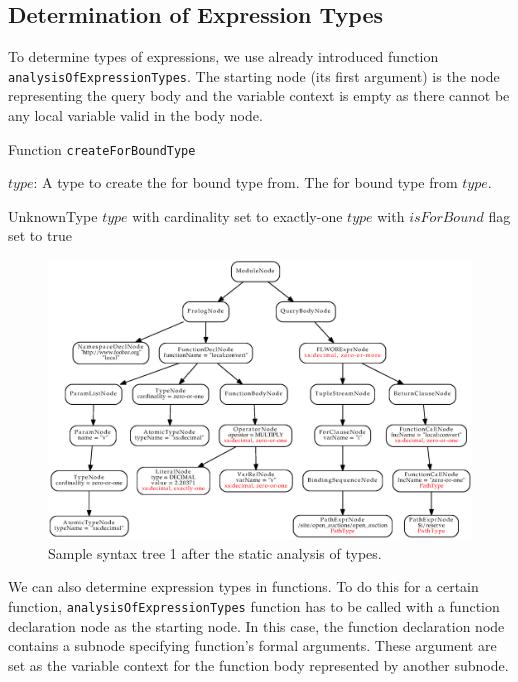 \subsection{Determination of Expression Types}
To determine types of expressions, we use already introduced function \\ \texttt{analysisOfExpressionTypes}. The starting node (its first argument) is the node representing the query body and the variable context is empty as there cannot be any local variable valid in the body node.

\begin{algorithm}
\caption{Function \texttt{createForBoundType}}
\label{ALG_function_create_for_bound_type}
\begin{algorithmic}[1]
\REQUIRE $type$: A type to create the for bound type from.
\ENSURE The for bound type from $type$.

	\RETURN UnknownType
	\RETURN $type$ with cardinality set to exactly-one
\ELSE
	\STATE {}
	\RETURN $type$ with $isForBound$ flag set to true
\ENDIF
\end{algorithmic}
\end{algorithm}

\begin{figure}
\label{FIG_syntax_tree_1_types}
\caption{Sample syntax tree 1 after the static analysis of types.}
\includegraphics[scale=0.6]{syntax_tree_1_types.eps}
\end{figure}

We can also determine expression types in functions. To do this for a certain function, \texttt{analysisOfExpressionTypes} function has to be called with a function declaration node as the starting node. In this case, the function declaration node contains a subnode specifying function's formal arguments. These argument are set as the variable context for the function body represented by another subnode.


